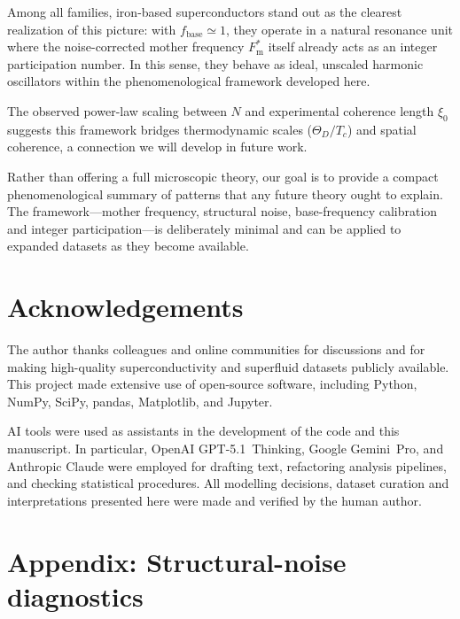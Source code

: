 \documentclass[aps,prb,twocolumn,superscriptaddress,floatfix,nofootinbib]{revtex4-2}
\newcommand{\Fmstar}{\ensuremath{{F_{\mathrm{m}}^{\ast}}}}
\newcommand{\fbase}{\ensuremath{{f_{\mathrm{base}}}}}
\begin{document}
Among all families, iron-based superconductors stand out as the
clearest realization of this picture: with $\fbase \simeq 1$,
they operate in a natural resonance unit where the noise-corrected
mother frequency $\Fmstar$ itself already acts as an integer
participation number.
In this sense, they behave as ideal, unscaled harmonic oscillators
within the phenomenological framework developed here.

The observed power-law scaling between $N$ and experimental coherence 
length $\xi_0$ suggests this framework bridges thermodynamic scales ($\Theta_D/T_c$) 
and spatial coherence, a connection we will develop in future work.

Rather than offering a full microscopic theory, our goal is to
provide a compact phenomenological summary of patterns that any
future theory ought to explain.
The framework---mother frequency, structural noise, base-frequency
calibration and integer participation---is deliberately minimal
and can be applied to expanded datasets as they become available.

\section*{Acknowledgements}

The author thanks colleagues and online communities for discussions and for
making high-quality superconductivity and superfluid datasets publicly
available. This project made extensive use of open-source software, including
Python, NumPy, SciPy, pandas, Matplotlib, and Jupyter.

AI tools were used as assistants in the development of the code and this
manuscript. In particular, OpenAI GPT-5.1~Thinking, Google Gemini~Pro, and
Anthropic Claude were employed for drafting text, refactoring analysis
pipelines, and checking statistical procedures. All modelling decisions,
dataset curation and interpretations presented here were made and verified by
the human author.

\clearpage
\appendix

\onecolumngrid 

\section*{Appendix: Structural-noise diagnostics}
\end{document}
